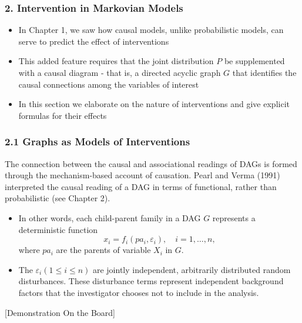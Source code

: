 \documentclass{beamer}
\begin{document}
\begin{frame}
\frametitle{2. Intervention in Markovian Models}
\begin{itemize}
\item In Chapter 1, we saw how causal models, unlike probabilistic models, can serve to predict the effect of interventions
\item This added feature requires that the joint distribution $P$ be supplemented with a causal diagram - that is, a directed acyclic graph $G$ that identifies the causal connections among the variables of interest
\item In this section we elaborate on the nature of interventions and give explicit formulas for their effects
\end{itemize}
\end{frame}

\begin{frame}
\frametitle{2.1 Graphs as Models of Interventions}
The connection between the causal and associational readings of DAGs is formed through the mechanism-based account of causation. Pearl and Verma (1991) interpreted the causal reading of a DAG in terms of functional, rather than probabilistic (see Chapter 2).
\begin{itemize}
\item In other words, each child-parent family in a DAG $G$ represents a deterministic function
$$
x_i=f_i\left(p a_i, \varepsilon_i\right), \quad i=1, \ldots, n,
$$
where $pa_i$ are the parents of variable $X_i$ in $G$.
\item The $\varepsilon_i(1 \leq i \leq n)$ are jointly independent, arbitrarily distributed random disturbances. These disturbance terms represent independent background factors that the investigator chooses not to include in the analysis.
\end{itemize}

\begin{center}
[Demonstration On the Board]
\end{center}
\end{frame}
\end{document}
